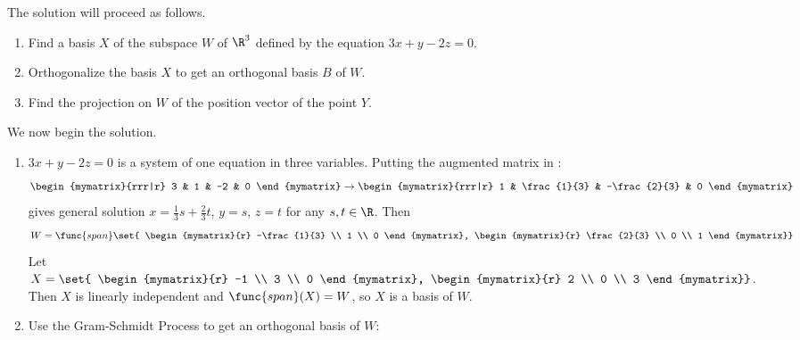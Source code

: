 \begin{solution}
The solution will proceed as follows.
\begin{enumerate}
\item Find a basis $X$ of the subspace $W$ of $\R^3$ defined by
the equation  $3x+y-2z=0$.
\item Orthogonalize the basis $X$ to get an orthogonal basis
$B$ of $W$.
\item Find the projection on $W$ of the position vector of
the point $Y$.
\end{enumerate}

We now begin the solution.
\begin{enumerate}
\item $3x+y-2z=0$ is a system of one equation in three variables.
Putting the augmented matrix in {\rref}:
\[
\begin{mymatrix}{rrr|r} 3 & 1 & -2 & 0 \end{mymatrix}
\rightarrow
\begin{mymatrix}{rrr|r} 1 & \frac{1}{3} & -\frac{2}{3} & 0 \end{mymatrix}
\]
gives general solution $x=\frac{1}{3}s+\frac{2}{3}t$, $y=s$, $z=t$
for any $s,t\in\R$.
Then  
\[
W=\func{span} \set{
\begin{mymatrix}{r} -\frac{1}{3} \\ 1 \\ 0 \end{mymatrix},
\begin{mymatrix}{r} \frac{2}{3} \\ 0 \\ 1 \end{mymatrix}}
\]
Let
$X=\set{
\begin{mymatrix}{r} -1 \\ 3 \\ 0 \end{mymatrix},
\begin{mymatrix}{r} 2 \\ 0 \\ 3 \end{mymatrix}}$.
Then $X$ is linearly independent and $\func{span}(X)=W$, so $X$ is a basis of $W$.

\item Use the Gram-Schmidt Process to get an
orthogonal basis of $W$: 



\end{enumerate}
\end{solution}
